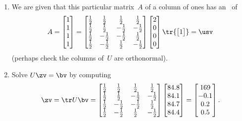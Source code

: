 \begin{example}
\begin{enumerate}
\item We are given that this particular matrix~\(A\) of a column of ones has an \svd\ of
\def\h{\frac12}
\begin{equation*}
A=\begin{bmatrix} 1\\1\\1\\1 \end{bmatrix}
=\begin{bmatrix} \h&\h&\h&\h
\\\h&\h&-\h&-\h
\\\h&-\h&-\h&\h
\\\h&-\h&\h&-\h \end{bmatrix}
\begin{bmatrix} 2\\0\\0\\0 \end{bmatrix}
\tr{\begin{bmatrix} 1 \end{bmatrix}}
=\usv
\end{equation*}
(perhaps check the columns of~\(U\) are orthonormal).

\item Solve \(U\zv=\bv\) by computing 
\begin{equation*}
\zv=\tr U\bv
=\begin{bmatrix} 
  \h&\h&\h&\h
\\\h&\h&-\h&-\h
\\\h&-\h&-\h&\h
\\\h&-\h&\h&-\h \end{bmatrix}
\begin{bmatrix} 84.8\\84.1\\84.7\\84.4 \end{bmatrix}
=\begin{bmatrix} 169\\-0.1\\0.2\\0.5 \end{bmatrix}.
\end{equation*}


\end{enumerate}
\end{example}
